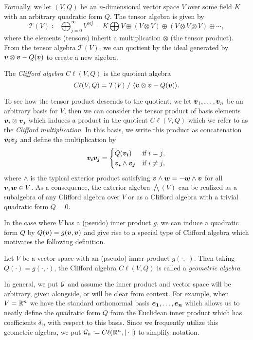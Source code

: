 Formally, we let $(V,Q)$ be an $n$-dimensional vector space $V$ over some field $K$ with an arbitrary quadratic form $Q$.  The tensor algebra is given by
\begin{equation}
\mathcal{T}(V) \coloneqq \bigoplus_{j=0}^\infty V^{\otimes j} = K \bigoplus V \oplus (V\otimes V) \oplus (V\otimes V \otimes V) \oplus \cdots,
\end{equation}
where the elements (tensors) inherit a multiplication $\otimes$ (the tensor product). From the tensor algebra $\mathcal{T}(V)$, we can quotient by the ideal generated by $\boldsymbol{v}\otimes \boldsymbol{v} - Q(\boldsymbol{v})$ to create a new algebra.
\begin{definition}
The \emph{Clifford algebra} $C\ell(V,Q)$ is the quotient algebra
\begin{equation}
C\ell(V,Q) = \mathcal{T}(V) ~ / ~ \langle \boldsymbol{v} \otimes \boldsymbol{v} - Q(\boldsymbol{v}) \rangle.
\end{equation}
\end{definition}
To see how the tensor product descends to the quotient, we let $\boldsymbol{v}_1, \dots, \boldsymbol{v}_n$ be an arbitrary basis for $V$, then we can consider the tensor product of basis elements $\boldsymbol{v}_i \otimes \boldsymbol{v}_j$ which induces a product in the quotient $C\ell(V,Q)$ which we refer to as the \emph{Clifford multiplication}. In this basis, we write this product as concatenation $\boldsymbol{v_i}\boldsymbol{v_j}$ and define the multiplication by
\begin{equation}
\label{eq:clifford_multiplication}
\boldsymbol{v_i} \boldsymbol{v_j} = \begin{cases} Q(\boldsymbol{v_i}) & \textrm{if $i=j$}, \\ \boldsymbol{v_i} \wedge \boldsymbol{v_j} & \textrm{if $i\neq j$},\end{cases}
\end{equation}
where $\wedge$ is the typical exterior product satisfying $\boldsymbol{v}\wedge \boldsymbol{w} = - \boldsymbol{w}\wedge \boldsymbol{v}$ for all $\boldsymbol{v},\boldsymbol{w}\in V$.  As a consequence, the exterior algebra $\bigwedge(V)$ can be realized as a subalgebra of any Clifford algebra over $V$ or as a Clifford algebra with a trivial quadratic form $Q=0$.  

In the case where $V$ has a (pseudo) inner product $g$, we can induce a quadratic form $Q$ by $Q(\boldsymbol{v})=g(\boldsymbol{v},\boldsymbol{v})$ and give rise to a special type of Clifford algebra which motivates the following definition.
\begin{definition}
Let $V$ be a vector space with an (pseudo) inner product $g(\cdot,\cdot)$. Then taking $Q(\cdot) = g(\cdot,\cdot)$, the Clifford algebra $C \ell(V,Q)$ is called a \emph{geometric algebra}.
\end{definition}
In general, we put $\mathcal{G}$ and assume the inner product and vector space will be arbitrary, given alongside, or will be clear from context.  For example, when $V=\mathbb{R}^n$ we have the standard orthonormal basis $\boldsymbol{e_1},\dots,\boldsymbol{e_n}$ which allows us to neatly define the quadratic form $Q$ from the Euclidean inner product which has coefficients $\delta_{ij}$ with respect to this basis. Since we frequently utilize this geometric algebra, we put $\mathcal{G}_n \coloneqq C\ell(\mathbb{R}^n, |\cdot|)$ to simplify notation. 

